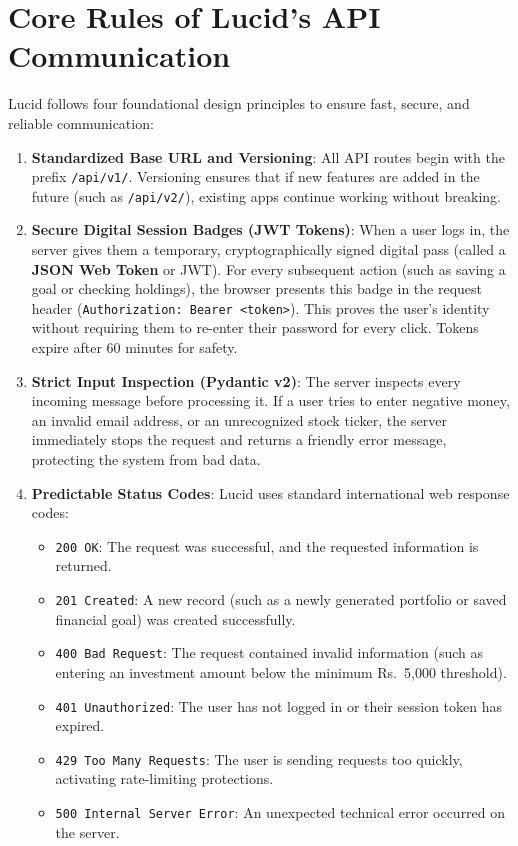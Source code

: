 \section{Core Rules of Lucid's API Communication}
Lucid follows four foundational design principles to ensure fast, secure, and reliable communication:
\begin{enumerate}
    \item \textbf{Standardized Base URL and Versioning}: All API routes begin with the prefix \texttt{/api/v1/}. Versioning ensures that if new features are added in the future (such as \texttt{/api/v2/}), existing apps continue working without breaking.
    \item \textbf{Secure Digital Session Badges (JWT Tokens)}: When a user logs in, the server gives them a temporary, cryptographically signed digital pass (called a \textbf{JSON Web Token} or JWT). For every subsequent action (such as saving a goal or checking holdings), the browser presents this badge in the request header (\texttt{Authorization: Bearer <token>}). This proves the user's identity without requiring them to re-enter their password for every click. Tokens expire after 60 minutes for safety.
    \item \textbf{Strict Input Inspection (Pydantic v2)}: The server inspects every incoming message before processing it. If a user tries to enter negative money, an invalid email address, or an unrecognized stock ticker, the server immediately stops the request and returns a friendly error message, protecting the system from bad data.
    \item \textbf{Predictable Status Codes}: Lucid uses standard international web response codes:
    \begin{itemize}
        \item \texttt{200 OK}: The request was successful, and the requested information is returned.
        \item \texttt{201 Created}: A new record (such as a newly generated portfolio or saved financial goal) was created successfully.
        \item \texttt{400 Bad Request}: The request contained invalid information (such as entering an investment amount below the minimum Rs.~5,000 threshold).
        \item \texttt{401 Unauthorized}: The user has not logged in or their session token has expired.
        \item \texttt{429 Too Many Requests}: The user is sending requests too quickly, activating rate-limiting protections.
        \item \texttt{500 Internal Server Error}: An unexpected technical error occurred on the server.
    \end{itemize}
\end{enumerate}

